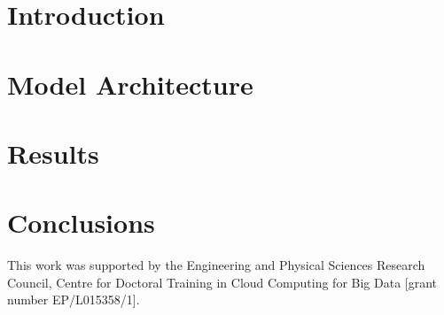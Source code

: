 \documentclass[sigconf]{acmart}
\begin{document}
%

%
\maketitle


\section{Introduction}





\section{Model Architecture} \label{Model}



\section{Results}\label{Scenario Testing}




\section{Conclusions}\label{Conclusion}





%


\begin{acks}
This work was supported by the Engineering and Physical Sciences Research Council, Centre for Doctoral Training in Cloud Computing for Big Data [grant number EP/L015358/1].
\end{acks}

\clearpage

%



% 
%
%
%
\end{document}
